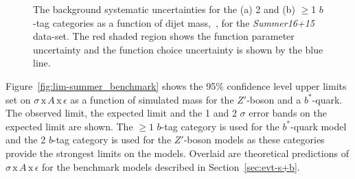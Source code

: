 \begin{figure}[!ht]
  \begin{center}
    \captionsetup[subfigure]{aboveskip=0pt,justification=centering}
  \end{center}
  \vspace{-1mm}
  \caption{The background systematic uncertainties for the (a) 2 and (b) $\geq$1 $b$-tag categories
    as a function of dijet mass,~\mjj, for the \textit{Summer16+15} data-set.
    The red shaded region shows the function parameter uncertainty and the
    function choice uncertainty is shown by the blue line. }
  \label{fig:lim-summer_systBkg}
\end{figure}

Figure~\ref{fig:lim-summer_benchmark} shows the
95\% confidence level upper limits set on $\sigma\,\text{x}\,\mathit{A}\,\text{x}\,\epsilon$
as a function of simulated mass
for the $Z'$-boson and a $b^*$-quark.
The observed limit, the expected limit and the 1 and 2 $\sigma$ error bands on the expected limit are shown.
The $\geq1$ $b$-tag category is used for the $b^*$-quark model
and the 2 $b$-tag category is used for the $Z'$-boson models
as these categories provide the strongest limits on the models.
Overlaid are theoretical predictions of
$\sigma\,\text{x}\,\mathit{A}\,\text{x}\,\epsilon$ for the benchmark models described in Section~\ref{sec:evt-s+b}.

